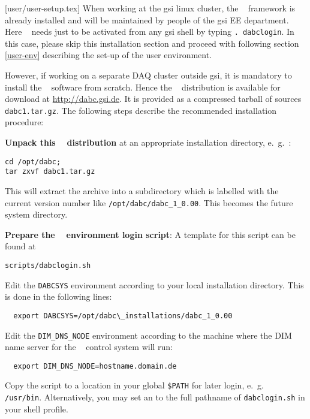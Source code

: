 [user/user-setup.tex]
When working at the gsi linux cluster, the \dabc~ framework is already installed and will
be maintained by people of the gsi EE department. Here \dabc~ needs just to be
activated from any gsi shell by typing {\tt . dabclogin}. In this case, 
please skip this installation section and proceed with following section \ref{user-env} describing
the set-up of the user environment.

However, if working on a separate DAQ cluster outside gsi, 
it is mandatory to install the \dabc~ software
from scratch. 
Hence the \dabc~ distribution is available for download at \hyperref{http://dabc.gsi.de}{}{}{http://dabc.gsi.de}.
It is provided as a compressed tarball of sources {\tt dabc1.tar.gz}.
The following steps describe the recommended installation procedure:

\bnum
\item {\bf Unpack this \dabc~ distribution} at an appropriate installation directory,
e.~g.~:
\begin{verbatim}
cd /opt/dabc; 
tar zxvf dabc1.tar.gz
\end{verbatim}
This will extract the archive into a subdirectory which is labelled
with the current version number like {\tt /opt/dabc/dabc\_1\_0.00}.
This becomes the future \dabc~ system directory.

\item {\bf Prepare the \dabc~ environment login script}:
A template for this script can be found at  
\begin{verbatim}
scripts/dabclogin.sh
\end{verbatim}


\bbul
  \item Edit the {\tt DABCSYS} environment according to your local installation directory. 
  This is done in the following lines:
  \begin{verbatim}
  export DABCSYS=/opt/dabc\_installations/dabc_1_0.00  
  \end{verbatim}  
  
  \item Edit the {\tt DIM\_DNS\_NODE} environment according to the machine where 
  the DIM name server \cite{DIM} for the \dabc~ control system will run:
   \begin{verbatim}
  export DIM_DNS_NODE=hostname.domain.de
  \end{verbatim}  
  \item Copy the script to a location in your global {\tt \$PATH} for later login,
  e.~g.~ {\tt /usr/bin}. Alternatively, you
  may set an  to the full pathname of {\tt dabclogin.sh} in your shell profile.
\ebul

